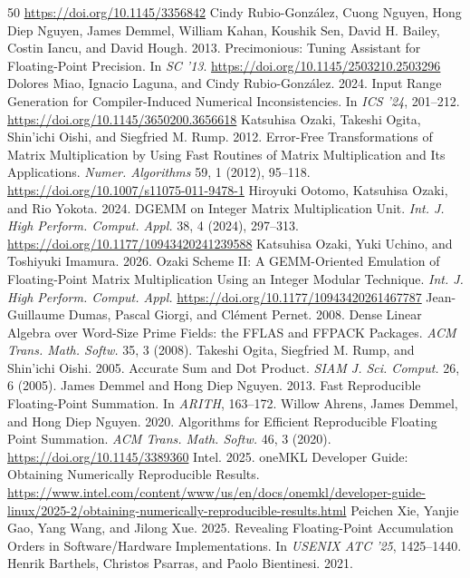 \documentclass[acmsmall,review,anonymous,nonacm]{acmart}
\begin{document}
\begin{thebibliography}{50}
\url{https://doi.org/10.1145/3356842}
 Cindy Rubio-Gonz\'alez, Cuong Nguyen, Hong Diep Nguyen,
James Demmel, William Kahan, Koushik Sen, David H. Bailey, Costin Iancu, and
David Hough. 2013. Precimonious: Tuning Assistant for Floating-Point Precision.
In \textit{SC '13}. \url{https://doi.org/10.1145/2503210.2503296}
 Dolores Miao, Ignacio Laguna, and Cindy Rubio-Gonz\'alez. 2024.
Input Range Generation for Compiler-Induced Numerical Inconsistencies. In
\textit{ICS '24}, 201--212. \url{https://doi.org/10.1145/3650200.3656618}
 Katsuhisa Ozaki, Takeshi Ogita, Shin'ichi Oishi, and Siegfried M.
Rump. 2012. Error-Free Transformations of Matrix Multiplication by Using Fast
Routines of Matrix Multiplication and Its Applications. \textit{Numer. Algorithms}
59, 1 (2012), 95--118. \url{https://doi.org/10.1007/s11075-011-9478-1}
 Hiroyuki Ootomo, Katsuhisa Ozaki, and Rio Yokota. 2024. DGEMM on
Integer Matrix Multiplication Unit. \textit{Int. J. High Perform. Comput. Appl.}
38, 4 (2024), 297--313. \url{https://doi.org/10.1177/10943420241239588}
 Katsuhisa Ozaki, Yuki Uchino, and Toshiyuki Imamura. 2026. Ozaki
Scheme II: A GEMM-Oriented Emulation of Floating-Point Matrix Multiplication Using
an Integer Modular Technique. \textit{Int. J. High Perform. Comput. Appl.}
\url{https://doi.org/10.1177/10943420261467787}
 Jean-Guillaume Dumas, Pascal Giorgi, and Cl\'ement Pernet. 2008.
Dense Linear Algebra over Word-Size Prime Fields: the FFLAS and FFPACK Packages.
\textit{ACM Trans. Math. Softw.} 35, 3 (2008).
 Takeshi Ogita, Siegfried M. Rump, and Shin'ichi Oishi. 2005.
Accurate Sum and Dot Product. \textit{SIAM J. Sci. Comput.} 26, 6 (2005).
 James Demmel and Hong Diep Nguyen. 2013. Fast Reproducible
Floating-Point Summation. In \textit{ARITH}, 163--172.
 Willow Ahrens, James Demmel, and Hong Diep Nguyen. 2020.
Algorithms for Efficient Reproducible Floating Point Summation. \textit{ACM Trans.
Math. Softw.} 46, 3 (2020). \url{https://doi.org/10.1145/3389360}
 Intel. 2025. oneMKL Developer Guide: Obtaining Numerically
Reproducible Results.
\url{https://www.intel.com/content/www/us/en/docs/onemkl/developer-guide-linux/2025-2/obtaining-numerically-reproducible-results.html}
 Peichen Xie, Yanjie Gao, Yang Wang, and Jilong Xue. 2025.
Revealing Floating-Point Accumulation Orders in Software/Hardware
Implementations. In \textit{USENIX ATC '25}, 1425--1440.
 Henrik Barthels, Christos Psarras, and Paolo Bientinesi. 2021.

\end{thebibliography}
\end{document}
